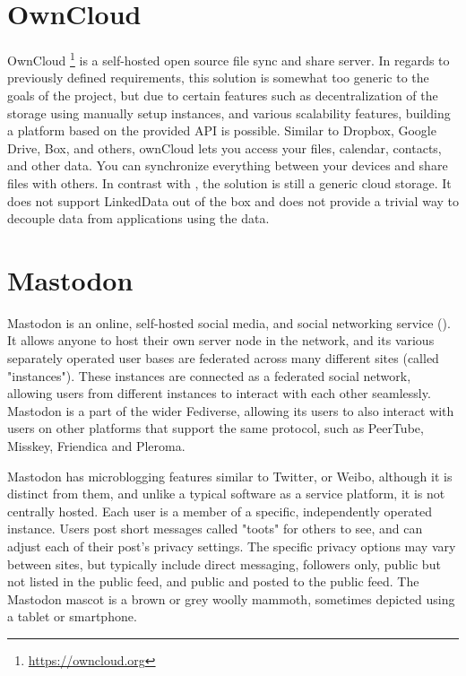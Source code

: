 \section{OwnCloud}

OwnCloud \footnote{\url{https://owncloud.org}} is a self-hosted open source file sync and share server. In regards to previously defined requirements, this solution is somewhat too generic to the goals of the project, but due to certain features such as decentralization of the storage using manually setup instances, and various scalability features, building a platform based on the provided API is possible. Similar to Dropbox, Google Drive, Box, and others, ownCloud lets you access your files, calendar, contacts, and other data. You can synchronize everything between your devices and share files with others. In contrast with \solid{}, the solution is still a generic cloud storage. It does not support LinkedData out of the box and does not provide a trivial way to decouple data from applications using the data. 

\section{Mastodon}

Mastodon is an online, self-hosted social media, and social networking service (\cite{zignani2018follow}). It allows anyone to host their own server node in the network, and its various separately operated user bases are federated across many different sites (called "instances"). These instances are connected as a federated social network, allowing users from different instances to interact with each other seamlessly. Mastodon is a part of the wider Fediverse, allowing its users to also interact with users on other platforms that support the same protocol, such as PeerTube, Misskey, Friendica and Pleroma.

Mastodon has microblogging features similar to Twitter, or Weibo, although it is distinct from them, and unlike a typical software as a service platform, it is not centrally hosted. Each user is a member of a specific, independently operated instance. Users post short messages called "toots" for others to see, and can adjust each of their post's privacy settings. The specific privacy options may vary between sites, but typically include direct messaging, followers only, public but not listed in the public feed, and public and posted to the public feed. The Mastodon mascot is a brown or grey woolly mammoth, sometimes depicted using a tablet or smartphone.

